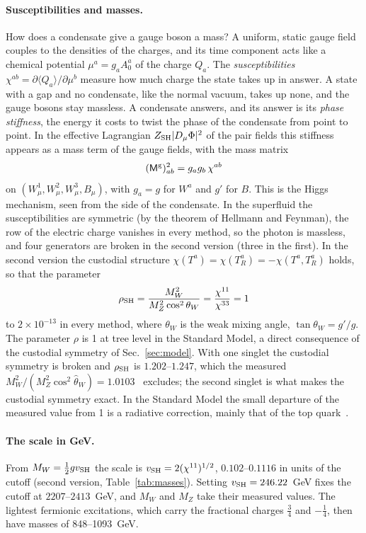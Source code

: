 \documentclass[aps,prd,twocolumn,superscriptaddress,nofootinbib,floatfix,longbibliography]{revtex4-2}
\newcommand{\SH}{{\rm SH}}
\begin{document}
\paragraph*{Susceptibilities and masses.}
How does a condensate give a gauge boson a mass? A uniform, static gauge field couples to the densities of the charges,
and its time component acts like a chemical potential $\mu^a=g_aA^a_0$ of the charge $Q_a$. The \emph{susceptibilities}
$\chi^{ab}=\partial\langle Q_a\rangle/\partial\mu^b$ measure how much charge the state takes up in answer. A state with a
gap and no condensate, like the normal vacuum, takes up none, and the gauge bosons stay massless. A condensate answers,
and its answer is its \emph{phase stiffness}, the energy it costs to twist the phase of the condensate from point to
point. In the effective Lagrangian $Z_\SH|D_\mu\Phi|^2$ of the pair fields this stiffness appears as a mass term of the
gauge fields, with the mass matrix
\begin{equation}
(\mathsf M^{\rm g})^2_{ab}=g_ag_b\,\chi^{ab}
\label{eq:Mg}
\end{equation}
on $(W^1_\mu,W^2_\mu,W^3_\mu,B_\mu)$, with $g_a=g$ for $W^a$ and $g'$ for $B$. This is the Higgs mechanism, seen from the
side of the condensate. In the superfluid the susceptibilities are symmetric (by the theorem of Hellmann and Feynman),
the row of the electric charge vanishes in every method, so the photon is massless, and four generators are broken in
the second version (three in the first). In the second version the custodial structure
$\chi(T^a)=\chi(T^a_R)=-\chi(T^a,T^a_R)$ holds, so that the parameter
\begin{equation}
\rho_\SH=\frac{M_W^2}{M_Z^2\cos^2\theta_W}=\frac{\chi^{11}}{\chi^{33}}=1
\label{eq:rho}
\end{equation}
to \ensuremath{2\times10^{-13}} in every method, where $\theta_W$ is the weak mixing angle, $\tan\theta_W=g'/g$. The parameter $\rho$ is
1 at tree level in the Standard Model, a direct consequence of the custodial symmetry of Sec.~\ref{sec:model}. With one
singlet the custodial symmetry is broken and $\rho_\SH$ is \ensuremath{1.202}\mbox{--}\ensuremath{1.247}, which the measured
$M_W^2/(M_Z^2\cos^2\hat\theta_W)=1.0103$~\cite{PDG2026} excludes; the second singlet is what makes the custodial
symmetry exact. In the Standard Model the small departure of the measured value from 1 is a radiative correction, mainly
that of the top quark~\cite{Veltman1977}.

\paragraph*{The scale in GeV.}
From $M_W=\frac12gv_\SH$ the scale is $v_\SH=2(\chi^{11})^{1/2}$, \ensuremath{0.102}\mbox{--}\ensuremath{0.1116} in units of the cutoff (second version,
Table~\ref{tab:masses}). Setting $v_\SH=246.22$~GeV fixes the cutoff at \ensuremath{2207}\mbox{--}\ensuremath{2413}~GeV, and $M_W$ and $M_Z$ take their
measured values. The lightest fermionic excitations, which carry the fractional charges $\frac34$ and $-\frac14$, then
have masses of 848\mbox{--}1093~GeV.
\end{document}
